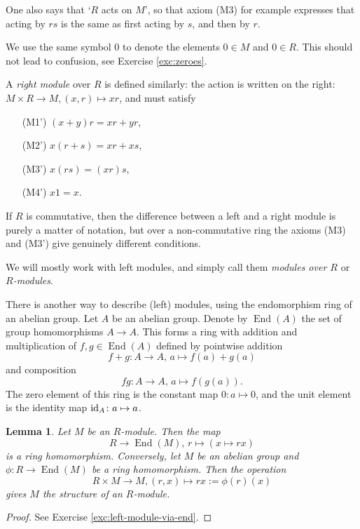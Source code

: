 \documentclass[11pt]{amsbook}
\DeclareMathOperator{\End}{\mathrm{End}}
\def\id{{\rm id}}
\theoremstyle{plain}
\newtheorem{lemma}[theorem]{Lemma}
\theoremstyle{definition}
\begin{document}
One also says that `$R$ acts on $M$', so that axiom (M3) for example expresses that acting by $rs$ is the same as first acting by $s$, and then by $r$.

We use the same symbol $0$ to denote the elements $0\in M$ and $0\in R$. This should not lead to confusion, see Exercise \ref{exc:zeroes}.

A \emph{right module} over $R$ is defined similarly: the action is written on the right: $M\times R\to M, (x,r) \mapsto xr$, and must satisfy
\begin{enumerate}
\item[(M1')] $(x+y)r=xr+yr$,
\item[(M2')] $x(r+s)=xr+xs$,
\item[(M3')] $x(rs)=(xr)s$,
\item[(M4')] $x1=x$.
\end{enumerate}

 If $R$ is commutative, then the difference between a left and a right module is purely a matter of notation, but over a non-commutative ring the axioms (M3) and (M3') give  genuinely different conditions.

We will mostly work with left modules, and simply call them \emph{modules over $R$} or \emph{$R$-modules}. 

There is another way to describe (left) modules, using the endomorphism ring of an abelian group.
Let $A$ be an abelian group. Denote by $\End(A)$ the set of group homomorphisms $A\to A$. This forms a ring with addition and multiplication of $f,g\in \End(A)$ defined by pointwise addition
\[
	f+g\colon A\to A, \,a \mapsto f(a)+g(a)
\]
and composition
\[
	fg\colon A\to A,\, a\mapsto f(g(a)).
\]
The zero element of this ring is the constant map $0\colon a \mapsto 0$, and the unit element is the identity map $\id_A\colon a\mapsto a$.


\begin{lemma}\label{lemma:left-module-via-end}
Let $M$ be an $R$-module. Then the map
\[
	R \to \End(M), \, r \mapsto \left( x \mapsto rx \right)
\]
is a ring homomorphism. Conversely, let $M$ be an abelian group and $\phi\colon R\to \End(M)$ be a ring homomorphism. Then the operation
\[
	R\times M \to M, (r, x) \mapsto rx:= \phi(r)(x)
\]
gives $M$ the structure of an $R$-module.
\end{lemma}

\begin{proof}See Exercise \ref{exc:left-module-via-end}.
\end{proof}
\end{document}

